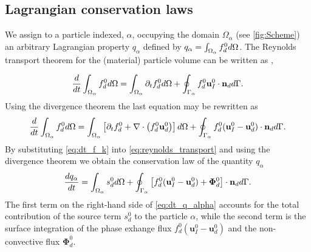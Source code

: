\subsection{Lagrangian conservation laws}



We assign to a particle indexed, $\alpha$, occupying the domain $\Omega_\alpha$ (see \ref{fig:Scheme}) an arbitrary Lagrangian property $q_\alpha$ defined by $q_\alpha  = \int_{\Omega_{\alpha}}  f_d^0 d\Omega$. The Reynolds transport theorem for the (material) particle volume can be written as \citep{leal2007advanced},

\begin{equation}
   \frac{d}{dt}  \int_{\Omega_{\alpha}} f_d^0 d\Omega
    = \int_{\Omega_{\alpha}} \partial_t f_d^0  d\Omega\\
    + \oint_{\Gamma_{\alpha}}  f_d^0 \textbf{u}_I^0\cdot \textbf{n}_d  d\Gamma.
    \label{eq:reynolds_transport0}
\end{equation}
Using the divergence theorem the last equation may be rewritten as
\begin{equation}
    \frac{d}{dt}  \int_{\Omega_{\alpha}} f_d^0 d\Omega
    = \int_{\Omega_{\alpha}} \left[ \partial_t f_d^0 + \mathbf{\nabla}\cdot\left(f_d^0\textbf{u}_d^0\right) \right] d\Omega\\
    + \oint_{\Gamma_{\alpha}}  f_d^0 (\textbf{u}_I^0-\textbf{u}_d^0)\cdot \textbf{n}_d  d\Gamma.
    \label{eq:reynolds_transport}
\end{equation}
By substituting \ref{eq:dt_f_k} into \ref{eq:reynolds_transport} and using the divergence theorem we obtain the conservation law of the quantity $q_\alpha$ %
\begin{equation}
    \frac{d q_\alpha}{d t}
    = \int_{\Omega_{\alpha}}  s_d^0  d\Omega
    + \oint_{\Gamma_{\alpha}}  \left[
        f_d^0 (\textbf{u}_I^0-\textbf{u}_d^0) 
        + \mathbf{\Phi}_d^0 
        \right] \cdot \textbf{n}_d  d\Gamma.
    \label{eq:dt_q_alpha}
\end{equation}
The first term on the right-hand side of \ref{eq:dt_q_alpha} accounts for the total contribution of the source term $s_d^0$ to the particle $\alpha$,
while the second term is the surface integration of the phase exhange flux $f_d^0 (\textbf{u}_I^0-\textbf{u}_d^0)$ and the non-convective flux $\mathbf{\Phi}_d^0$.

